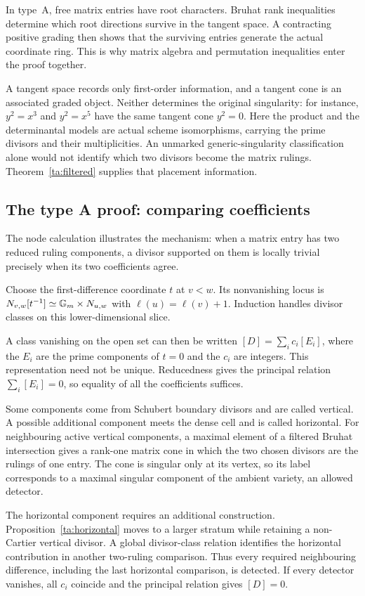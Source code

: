 In type~A, free matrix entries have root characters. Bruhat rank inequalities determine which root directions survive in the tangent space. A contracting positive grading then shows that the surviving entries generate the actual coordinate ring. This is why matrix algebra and permutation inequalities enter the proof together.

A tangent space records only first-order information, and a tangent cone is an associated graded object. Neither determines the original singularity: for instance, $y^2=x^3$ and $y^2=x^5$ have the same tangent cone $y^2=0$. Here the product and the determinantal models are actual scheme isomorphisms, carrying the prime divisors and their multiplicities. An unmarked generic-singularity classification alone would not identify which two divisors become the matrix rulings. Theorem~\ref{ta:filtered} supplies that placement information.

\subsection{The type A proof: comparing coefficients}
The node calculation illustrates the mechanism: when a matrix entry has two reduced ruling components, a divisor supported on them is locally trivial precisely when its two coefficients agree.

Choose the first-difference coordinate $t$ at $v<w$. Its nonvanishing locus is $N_{v,w}[t^{-1}]\simeq\mathbb G_m\times N_{u,w}$ with $\ell(u)=\ell(v)+1$. Induction handles divisor classes on this lower-dimensional slice.

A class vanishing on the open set can then be written $[D]=\sum_i c_i[E_i]$, where the $E_i$ are the prime components of $t=0$ and the $c_i$ are integers. This representation need not be unique. Reducedness gives the principal relation $\sum_i[E_i]=0$, so equality of all the coefficients suffices.

Some components come from Schubert boundary divisors and are called vertical. A possible additional component meets the dense cell and is called horizontal. For neighbouring active vertical components, a maximal element of a filtered Bruhat intersection gives a rank-one matrix cone in which the two chosen divisors are the rulings of one entry. The cone is singular only at its vertex, so its label corresponds to a maximal singular component of the ambient variety, an allowed detector.

The horizontal component requires an additional construction. Proposition~\ref{ta:horizontal} moves to a larger stratum while retaining a non-Cartier vertical divisor. A global divisor-class relation identifies the horizontal contribution in another two-ruling comparison. Thus every required neighbouring difference, including the last horizontal comparison, is detected. If every detector vanishes, all $c_i$ coincide and the principal relation gives $[D]=0$.

